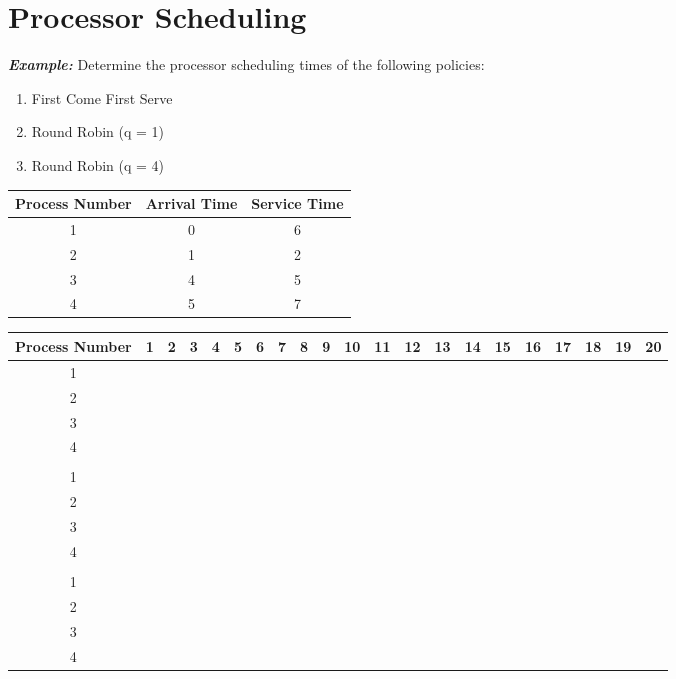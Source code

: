 \documentclass{article}
\newcommand{\generateHeader}{
\hline
Process Number & 1 & 2 & 3 & 4 & 5 & 6 & 7 & 8 & 9 & 10 & 11 & 12 & 13 & 14 & 15 & 16 & 17 & 18 & 19 & 20\\
\hline
}
\newcommand{\bc}{\cellcolor{blue!60}}
\newcommand{\blackc}{\cellcolor{black!}}
\newcommand{\blackrow}{
\blackc & \blackc & \blackc & \blackc & \blackc & \blackc & \blackc & \blackc & \blackc & \blackc & \blackc & \blackc & \blackc & \blackc & \blackc & \blackc & \blackc & \blackc & \blackc & \blackc & \blackc\\
\hline
}
\newcommand{\Example}{\textit{\textbf{Example: }}}
\begin{document}
\section{Processor Scheduling}
\Example Determine the processor scheduling times of the following policies:
\begin{enumerate}
\item First Come First Serve
\item Round Robin (q = 1)
\item Round Robin (q = 4)
\end{enumerate}
\begin{center}
\begin{tabular}{|c|c|c|}
\hline
Process Number & Arrival Time & Service Time\\
\hline
1 & 0 & 6\\
\hline
2 & 1 & 2\\
\hline
3 & 4 & 5\\
\hline
4 & 5 & 7\\
\hline
\end{tabular}

\vspace{0.5cm}

\begin{tabular}{|c|c|c|c|c|c|c|c|c|c|c|c|c|c|c|c|c|c|c|c|c|}
\generateHeader
1	&\bc	&\bc	&\bc	&\bc	&\bc	&\bc	&	&	&	&	&	&	&	&	&	&	&	&	&	&\\
\hline
2	&	&	&	&	&	&	&\bc &\bc &	&	&	&	&	&	&	&	&	&	&	&\\
\hline
3 	& 	& 	&	&	&	&	&	&	&\bc &\bc &\bc & \bc &\bc &	&	&	&	&	&	&\\
\hline
4	&	&	&	&	&	&	&	&	&	&	&	&	&	&\bc &\bc &\bc &\bc	&\bc	&\bc	&\bc\\
\hline
\blackrow
1	&\bc	&	&\bc	&	&\bc	&	&	&\bc	&	&	&\bc	&	&	&\bc	&	&	&	&	&	&\\
\hline
2	&	&\bc	&	&\bc	&	&	&	&	&	&	&	&	&	&	&	&	&	&	&	&\\
\hline
3	&	&	&	&	&	&\bc	&	&	&\bc	&	&	&\bc	&	&	&\bc	&	&\bc	&	&	&\\
\hline
4	&	&	&	&	&	&	&\bc	&	&	&\bc	&	&	&\bc	&	&	&\bc	&	&\bc	&\bc	&\bc\\
\hline
\blackrow
1	&\bc	&\bc	&\bc	&\bc	&	&	&	&	&	&	&\bc	&\bc	&	&	&	&	&	&	&	&\\
\hline
2	&	&	&	&	&\bc	&\bc	&	&	&	&	&	&	&	&	&	&	&	&	&	&\\
\hline
3	&	&	&	&	&	&	&\bc	&\bc	&\bc	&\bc	&	&	&	&	&	&	&\bc	&	&	&\\
\hline
4	&	&	&	&	&	&	&	&	&	&	&	&	&\bc	&\bc	&\bc	&\bc	&	&\bc	&\bc	&\bc\\
\hline
\end{tabular}
\end{center}
\newpage
\end{document}
